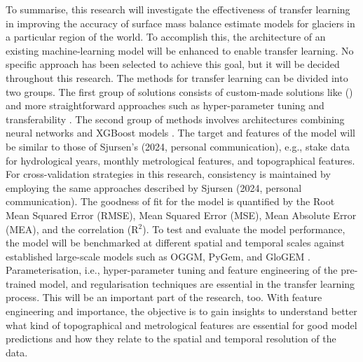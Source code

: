 To summarise, this research will investigate the effectiveness of transfer learning in improving the accuracy of surface mass balance estimate models for glaciers in a particular region of the world. To accomplish this, the architecture of an existing machine-learning model will be enhanced to enable transfer learning. No specific approach has been selected to achieve this goal, but it will be decided throughout this research. The methods for transfer learning can be divided into two groups. The first group of solutions consists of custom-made solutions like \citeauthor{sun-2022}(\citeyear{sun-2022}) and more straightforward approaches such as hyper-parameter tuning and transferability \cite{pydata-2023, woznica-2023}. The second group of methods involves architectures combining neural networks and XGBoost models \cite{sarkar-2022, he-2022, shietal2018}. The target and features of the model will be similar to those of Sjursen's (2024, personal communication), e.g., stake data for hydrological years, monthly metrological features, and topographical features. For cross-validation strategies in this research, consistency is maintained by employing the same approaches described by Sjursen (2024, personal communication). The goodness of fit for the model is quantified by the Root Mean Squared Error (RMSE), Mean Squared Error (MSE), Mean Absolute Error (MEA), and the correlation (R$^2$). To test and evaluate the model performance, the model will be benchmarked at different spatial and temporal scales against established large-scale models such as OGGM, PyGem, and GloGEM \cite{maussion2019oggm, Rounce2022, huss-2012}. Parameterisation, i.e., hyper-parameter tuning and feature engineering of the pre-trained model, and regularisation techniques are essential in the transfer learning process. This will be an important part of the research, too. With feature engineering and importance, the objective is to gain insights to understand better what kind of topographical and metrological features are essential for good model predictions and how they relate to the spatial and temporal resolution of the data.  
